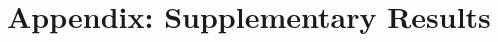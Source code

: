 \documentclass[phd]{UWMThesis}
\renewcommand{\.}{\textrm{ .}}
\theoremstyle{definition}
\numberwithin{thm}{chapter}
\begin{document}
	\ThesisAppendix
	
	\setcounter{equation}{0}
	\setcounter{table}{0}
	
	\renewcommand{\theequation}{A\arabic{equation}}
	\renewcommand{\thetable}{A\arabic{table}}
	\renewcommand{\thethm}{A.\arabic{thm}}
	
	\chapter*{Appendix: Supplementary Results}
\end{document}
